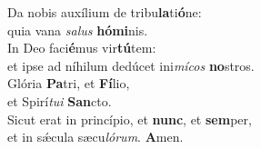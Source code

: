 \oddverse Da nobis auxílium de tribu\textbf{la}ti\textbf{ó}ne:~\*\\
\oddverse quia vana \textit{sa}\textit{lus} \textbf{hó}\textbf{mi}nis.\\
\evenverse In Deo faci\textbf{é}mus vir\textbf{tú}tem:~\*\\
\evenverse et ipse ad níhilum dedúcet ini\textit{mí}\textit{cos} \textbf{no}stros.\\
\oddverse Glória \textbf{Pa}tri, et \textbf{Fí}lio,~\*\\
\oddverse et Spirí\textit{tu}\textit{i} \textbf{San}cto.\\
\evenverse Sicut erat in princípio, et \textbf{nunc}, et \textbf{sem}per,~\*\\
\evenverse et in sǽcula sæcu\textit{ló}\textit{rum}. \textbf{A}men.\\
